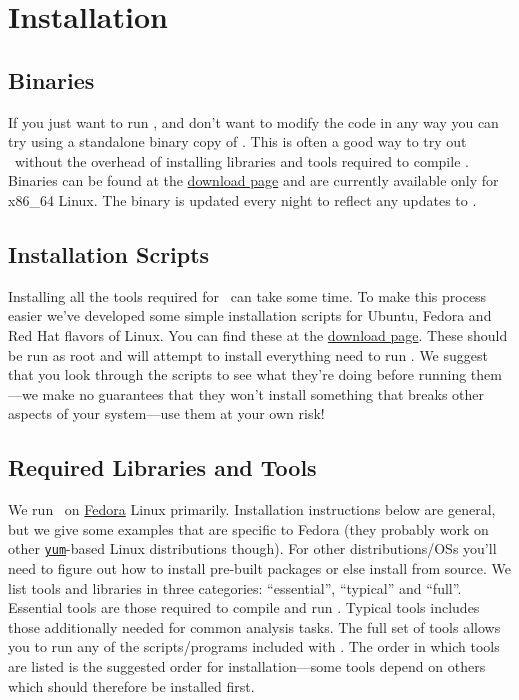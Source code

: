\chapter{Installation}

\section{Binaries}

If you just want to run \glc, and don't want to modify the code in any way you can try using a standalone binary copy of \glc. This is often a good way to try out \glc\ without the overhead of installing libraries and tools required to compile \glc. Binaries can be found at the \href{https://sites.google.com/site/galacticusmodel/downloads}{download page} and are currently available only for x86\_64 Linux. The binary is updated every night to reflect any updates to \glc.

\section{Installation Scripts}

Installing all the tools required for \glc\ can take some time. To make this process easier we've developed some simple installation scripts for Ubuntu, Fedora and Red Hat flavors of Linux. You can find these at the \href{https://sites.google.com/site/galacticusmodel/downloads}{download page}. These should be run as root and will attempt to install everything need to run \glc. We suggest that you look through the scripts to see what they're doing before running them---we make no guarantees that they won't install something that breaks other aspects of your system---use them at your own risk!

\section{Required Libraries and Tools}

We run \glc\ on \href{http://fedoraproject.org/}{Fedora} Linux primarily. Installation instructions below are general, but we give some examples that are specific to Fedora (they probably work on other \href{http://yum.baseurl.org/}{{\tt yum}}-based Linux distributions though). For other distributions/OSs you'll need to figure out how to install pre-built packages or else install from source. We list tools and libraries in three categories: ``essential'', ``typical'' and ``full''. Essential tools are those required to compile and run \glc. Typical tools includes those additionally needed for common analysis tasks. The full set of tools allows you to run any of the scripts/programs included with \glc. The order in which tools are listed is the suggested order for installation---some tools depend on others which should therefore be installed first.

